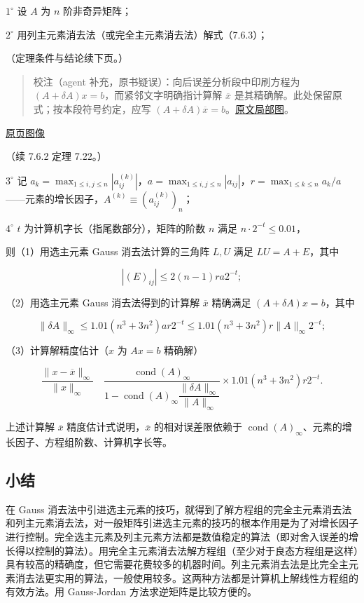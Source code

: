 \documentclass[
  10pt,
  fontset=fandol]{ctexart}
\begin{document}
\(1^\circ\) 设 \(A\) 为 \(n\) 阶非奇异矩阵；

\(2^\circ\) 用列主元素消去法（或完全主元素消去法）解式（7.6.3）；

（定理条件与结论续下页。）

\begin{quote}
校注（agent 补充，原书疑误）：向后误差分析段中印刷方程为 \((A+\delta A)x=b\)，而紧邻文字明确指计算解 \(\overline x\) 是其精确解。此处保留原式；按本段符号约定，应写 \((A+\delta A)\overline x=b\)。\href{../assets/ch07b/210-backward-error.png}{原文局部图}。
\end{quote}

\href{../../source-images/pdf-211.jpeg}{原页图像}

（续 7.6.2 定理 7.22。）

\(3^\circ\) 记 \(a_k=\max_{1\leqslant i,j\leqslant n}|a_{ij}^{(k)}|\)，\(a=\max_{1\leqslant i,j\leqslant n}|a_{ij}|\)，\(r=\max_{1\leqslant k\leqslant n}a_k/a\)------元素的增长因子，\(A^{(k)}\equiv(a_{ij}^{(k)})_n\)；

\(4^\circ\) \(t\) 为计算机字长（指尾数部分），矩阵的阶数 \(n\) 满足 \(n\cdot2^{-t}\leqslant0.01\)，

则（1）用选主元素 Gauss 消去法计算的三角阵 \(L,U\) 满足 \(LU=A+E\)，其中

\[
|(E)_{ij}|\leqslant2(n-1)ra2^{-t};
\]

（2）用选主元素 Gauss 消去法得到的计算解 \(\overline x\) 精确满足 \((A+\delta A)x=b\)，其中

\[
\|\delta A\|_\infty\leqslant1.01(n^3+3n^2)ar2^{-t}\leqslant1.01(n^3+3n^2)r\|A\|_\infty2^{-t};
\]

（3）计算解精度估计（\(x\) 为 \(Ax=b\) 精确解）

\[
\frac{\|x-\overline x\|_\infty}{\|x\|_\infty}
\quad
\frac{\operatorname{cond}(A)_\infty}
{1-\operatorname{cond}(A)_\infty\dfrac{\|\delta A\|_\infty}{\|A\|_\infty}}
\times1.01(n^3+3n^2)r2^{-t}.
\tag{7.6.14}
\]

上述计算解 \(\overline x\) 精度估计式说明，\(\overline x\) 的相对误差限依赖于 \(\operatorname{cond}(A)_\infty\)、元素的增长因子、方程组阶数、计算机字长等。

\subsection{小结}\label{ux5c0fux7ed3}

在 Gauss 消去法中引进选主元素的技巧，就得到了解方程组的完全主元素消去法和列主元素消去法，对一般矩阵引进选主元素的技巧的根本作用是为了对增长因子进行控制。完全选主元素及列主元素方法都是数值稳定的算法（即对舍入误差的增长得以控制的算法）。用完全主元素消去法解方程组（至少对于良态方程组是这样）具有较高的精确度，但它需要花费较多的机器时间。列主元素消去法是比完全主元素消去法更实用的算法，一般使用较多。这两种方法都是计算机上解线性方程组的有效方法。用 Gauss-Jordan 方法求逆矩阵是比较方便的。
\end{document}
